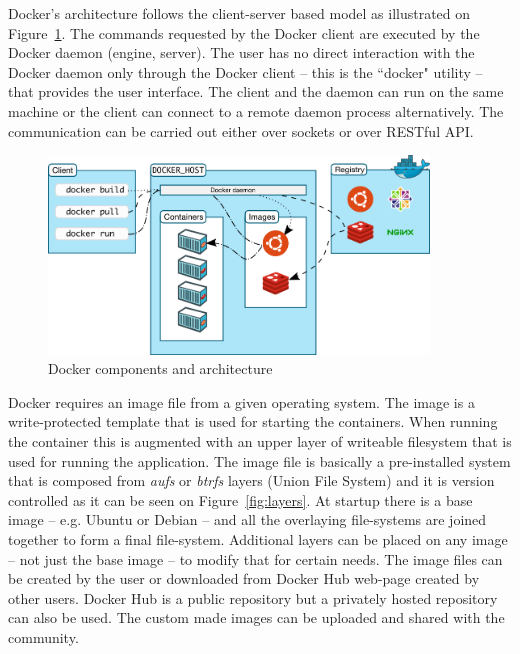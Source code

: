 \documentclass[a4paper]{article}
\begin{document}
Docker's architecture follows the client-server based model as illustrated on Figure~\ref{fig:arch}. The commands
requested by the Docker client are executed by the Docker daemon (engine, server).
The user has no direct interaction with the Docker daemon only through the Docker client -- this is the ``docker" utility --
that provides the
user interface. The client and the daemon can run on the same machine or the client can connect to a remote daemon
process alternatively. The communication can be carried out either over sockets or over RESTful API.

\begin{figure}[H]
    \centering
    \includegraphics[width=0.9\textwidth]{figures/docker_arch.png}
    \caption{Docker components and architecture}
    \label{fig:arch}
\end{figure}

Docker requires an image file from a given operating system. The image is a write-protected template that is used for
starting the containers.
When running the container this is augmented with an upper layer of writeable filesystem that is used for running the
application. The image file
is basically a pre-installed system that is composed from \emph{aufs} or \emph{btrfs} layers (Union File System) and it
is version controlled as it can be seen on Figure~\ref{fig:layers}.
At startup there is a base image -- e.g. Ubuntu or Debian -- and  all the overlaying file-systems are joined
together to form a final file-system. Additional layers can be placed on any image -- not just the base image -- to
modify that for certain needs. The image files can be created by the user or downloaded from Docker Hub web-page
created by other users. Docker Hub is a public repository but a privately hosted repository can also be used. The
custom made images can be uploaded and shared with the community.
\end{document}
